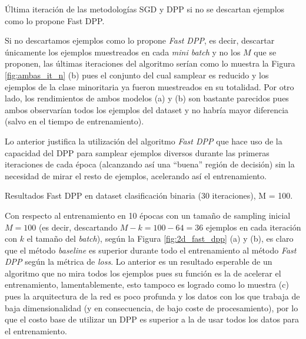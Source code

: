 \begin{images}[\label{fig:ambas_it_n}]{\centering Última iteración de las metodologías SGD y DPP si no se descartan ejemplos como lo propone Fast DPP.}

\end{images}

Si no descartamos ejemplos como lo propone \textit{Fast DPP}, es decir, descartar únicamente los ejemplos muestreados en cada \textit{mini batch} y no los $M$ que se proponen, las últimas iteraciones del algoritmo serían como lo muestra la Figura \ref{fig:ambas_it_n} (b) pues el conjunto del cual samplear es reducido y los ejemplos de la clase minoritaria ya fueron muestreados en su totalidad. Por otro lado, los rendimientos de ambos modelos (a) y (b) son bastante parecidos pues ambos observarían todos los ejemplos del dataset y no habría mayor diferencia (salvo en el tiempo de entrenamiento). 

\vspace{0.2cm}

Lo anterior justifica la utilización del algoritmo \textit{Fast DPP} que hace uso de la capacidad del DPP para samplear ejemplos diversos durante las primeras iteraciones de cada época (alcanzando así una ``buena'' región de decisión) sin la necesidad de mirar el resto de ejemplos, acelerando así el entrenamiento. 

\begin{images}[\label{fig:2d_fast_dpp}]{\centering Resultados Fast DPP en dataset clasificación binaria (30 iteraciones), M = 100.}

\end{images}

Con respecto al entrenamiento en 10 épocas con un tamaño de sampling inicial $M = 100$ (es decir, descartando $M-k = 100-64 = 36$ ejemplos en cada iteración con $k$ el tamaño del \textit{batch}), según la Figura \ref{fig:2d_fast_dpp} (a) y (b), es claro que el método \textit{baseline} es superior durante todo el entrenamiento al método \textit{Fast DPP} según la métrica de \textit{loss}. Lo anterior es un resultado esperable de un algoritmo que no mira todos los ejemplos pues su función es la de acelerar el entrenamiento, lamentablemente, esto tampoco es logrado como lo muestra (c) pues la arquitectura de la red es poco profunda y los datos con los que trabaja de baja dimensionalidad (y en consecuencia, de bajo coste de procesamiento), por lo que el costo base de utilizar un DPP es superior a la de usar todos los datos para el entrenamiento.  

